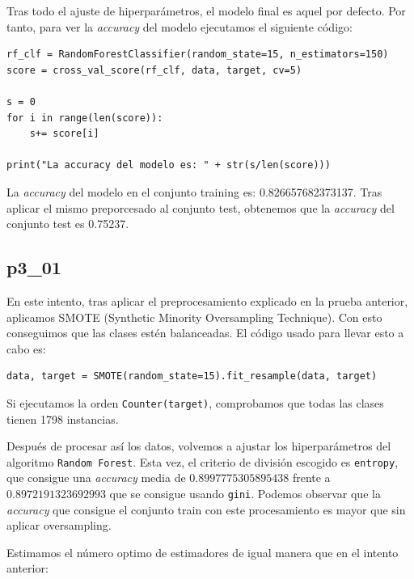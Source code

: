 \documentclass[a4]{article}
\begin{document}
Tras todo el ajuste de hiperparámetros, el modelo final es aquel por defecto. Por tanto, para ver la \textit{accuracy} del modelo ejecutamos el siguiente código:

\begin{lstlisting}
rf_clf = RandomForestClassifier(random_state=15, n_estimators=150)
score = cross_val_score(rf_clf, data, target, cv=5)

s = 0
for i in range(len(score)):
    s+= score[i]

print("La accuracy del modelo es: " + str(s/len(score)))
\end{lstlisting}

La \textit{accuracy} del modelo en el conjunto training es: 0.826657682373137. Tras aplicar el mismo preporcesado al conjunto test, obtenemos que la \textit{accuracy} del conjunto test es 0.75237. 

\subsection{p3\_01}

En este intento, tras aplicar el preprocesamiento explicado en la prueba anterior, aplicamos SMOTE (Synthetic Minority Oversampling Technique). Con esto conseguimos que las clases estén balanceadas. El código usado para llevar esto a cabo es:

\begin{lstlisting}
data, target = SMOTE(random_state=15).fit_resample(data, target)
\end{lstlisting}

Si ejecutamos la orden \texttt{Counter(target)}, comprobamos que todas las clases tienen 1798 instancias.

Después de procesar así los datos, volvemos a ajustar los hiperparámetros del algoritmo \texttt{Random Forest}. Esta vez, el criterio de división escogido es \texttt{entropy}, que consigue una \textit{accuracy} media de $0.8997775305895438$ frente a $0.8972191323692993$ que se consigue usando \texttt{gini}. Podemos observar que la \textit{accuracy} que consigue el conjunto train con este procesamiento es mayor que sin aplicar oversampling.

Estimamos el número optimo de estimadores de igual manera que en el intento anterior:
\end{document}
